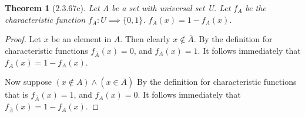 \documentclass[a4paper, 12pt]{article}
\theoremstyle{plain}
\newtheorem*{theorem*}{Theorem}
\begin{document}
	
	\begin{theorem*}[2.3.67c]
		Let A be a set with universal set U. Let $f_{A}$ be the \newline characteristic function $f_{\overline{A}}: U \implies \{0, 1\}$. $f_{\overline{A}}(x) = 1 - f_{A}(x)$.
	\end{theorem*}
	
	\begin{proof}
		Let $x$ be an element in $A$. Then clearly $x \notin \overline{A}$. By the definition for characteristic functions $f_{\overline{A}}(x) = 0$, and $f_{A}(x) = 1$. It follows immediately that $f_{\overline{A}}(x) = 1 - f_{A}(x)$.
		
		Now suppose $(x \notin A) \land (x \in \overline{A})$ By the definition for characteristic functions that is $f_{\overline{A}}(x) = 1$, and $f_{A}(x) = 0$. It follows immediately that $f_{\overline{A}}(x) = 1 - f_{A}(x)$.
	\end{proof}
\end{document}
